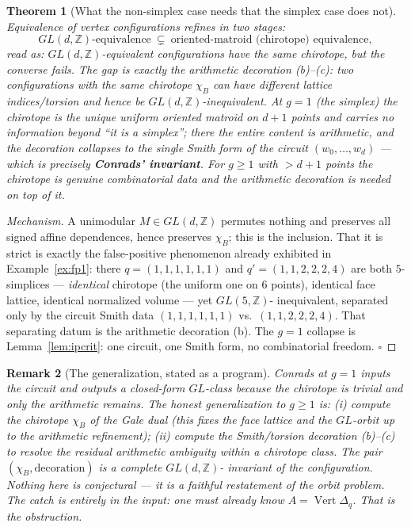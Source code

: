 \documentclass{amsart}
\newtheorem{theorem}{Theorem}[section]
\newtheorem{remark}[theorem]{Remark}
\begin{document}
\begin{theorem}[What the non-simplex case needs that the simplex case does not]
\label{thm:galerefine}
Equivalence of vertex configurations refines in two stages:
\begin{equation}\label{eq:refinechain}
  GL(d,\mathbb Z)\text{-equivalence}
  \ \subsetneq\
  \text{oriented-matroid (chirotope) equivalence},
\end{equation}
read as: $GL(d,\mathbb Z)$-equivalent configurations have the same chirotope, but
the converse \emph{fails}. The gap is exactly the arithmetic decoration
(b)--(c): two configurations with the same chirotope $\chi_B$ can have different
lattice indices/torsion and hence be $GL(d,\mathbb Z)$-inequivalent. At $g=1$
(the simplex) the chirotope is the unique uniform oriented matroid on $d{+}1$
points and carries \emph{no} information beyond ``it is a simplex''; there the
entire content is arithmetic, and the decoration collapses to the single Smith
form of the circuit $(w_0,\dots,w_d)$ --- which is precisely
\textbf{Conrads' invariant}. For $g\ge1$ with $>d{+}1$ points the chirotope is
genuine combinatorial data \emph{and} the arithmetic decoration is needed on top
of it.
\end{theorem}

\begin{proof}[Mechanism]
A unimodular $M\in GL(d,\mathbb Z)$ permutes nothing and preserves all signed
affine dependences, hence preserves $\chi_B$; this is the inclusion. That it is
strict is exactly the false-positive phenomenon already exhibited in
Example~\ref{ex:fp1}: there $q=(1,1,1,1,1,1)$ and $q'=(1,1,2,2,2,4)$ are both
$5$-simplices --- \emph{identical} chirotope (the uniform one on $6$ points),
identical face lattice, identical normalized volume --- yet $GL(5,\mathbb Z)$-
inequivalent, separated only by the circuit Smith data $(1,1,1,1,1,1)$ vs.\
$(1,1,2,2,2,4)$. That separating datum is the arithmetic decoration (b). The
$g=1$ collapse is Lemma~\ref{lem:ipcrit}: one circuit, one Smith form, no
combinatorial freedom. $\square$
\end{proof}

\begin{remark}[The generalization, stated as a program]\label{rmk:galeprogram}
Conrads at $g=1$ inputs the circuit and outputs a closed-form $GL$-class because
\emph{the chirotope is trivial and only the arithmetic remains}. The honest
generalization to $g\ge1$ is: \emph{(i)} compute the chirotope $\chi_B$ of the
Gale dual (this fixes the face lattice and the $GL$-orbit \emph{up to} the
arithmetic refinement); \emph{(ii)} compute the Smith/torsion decoration
(b)--(c) to resolve the residual arithmetic ambiguity within a chirotope class.
The pair $(\chi_B,\text{decoration})$ is a \emph{complete} $GL(d,\mathbb Z)$-
invariant of the configuration. Nothing here is conjectural --- it is a faithful
restatement of the orbit problem. The catch is entirely in the \emph{input}:
one must already know $A=\operatorname{Vert}\Delta_q$. That is the obstruction.
\end{remark}
\end{document}
